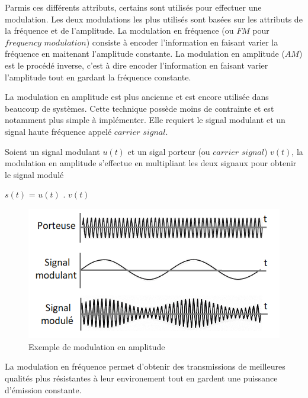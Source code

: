 \vspace{0.1cm}

Parmis ces différents attributs, certains sont utilisés pour effectuer une modulation. Les deux modulations les plus utilisés sont basées sur les attributs de la fréquence et de l'amplitude. La modulation en fréquence (ou $FM$ pour $frequency$ $modulation$) consiste à encoder l'information en faisant varier la fréquence en maitenant l'amplitude constante. La modulation en amplitude ($AM$) est le procédé inverse, c'est à dire encoder l'information en faisant varier l'amplitude tout en gardant la fréquence constante. 

\vspace{0.1cm}

La modulation en amplitude est plus ancienne et est encore utilisée dans beaucoup de systèmes. Cette technique possède moins de contrainte et est notamment plus simple à implémenter. Elle requiert le signal modulant et un signal haute fréquence appelé $carrier$ $signal$.

\vspace{0.1cm}

Soient un signal modulant $u(t)$ et un sigal porteur (ou $carrier$ $signal$) $v(t)$, la modulation en amplitude s'effectue en multipliant les deux signaux pour obtenir le signal modulé 

\vspace{0.1cm}

$s(t)$ = $u(t)$ . $v(t)$

\begin{figure}[h]
\centering

\includegraphics[scale=1]{images/AM_mod.PNG}
\caption{Exemple de modulation en amplitude}\label{term1}
\end{figure}


La modulation en fréquence permet d'obtenir des transmissions de meilleures qualités plus résistantes à leur environement tout en gardent une puissance d'émission constante. 

